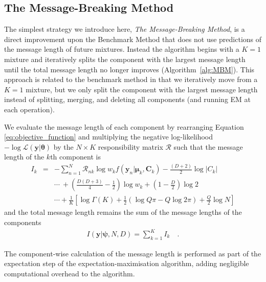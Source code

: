 \documentclass{elsarticle}
\newcommand{\vect}[1]{\boldsymbol{\mathbf{#1}}}
\renewcommand{\vec}[1]{\vect{#1}}
\def\cov{C}
\def\veccov{\vect{\cov}}
\def\vecmean{\vect{\mu}}
\def\vectheta{\vect{\theta}}
\def\weight{w}
\def\datum{y}
\def\data{\vect{\datum}}
\begin{document}
\subsection{The Message-Breaking Method} \label{sec:mbm}
The simplest strategy we introduce here, \emph{The Message-Breaking Method}, 
is a direct improvement upon the Benchmark Method that does not use predictions of the message length of future mixtures. Instead the algorithm begins with 
a $K=1$ mixture and iteratively splits the component with the largest message length until 
the total message length no longer improves (Algorithm~\ref{alg:MBM}). This approach is related to the benchmark method in that we iteratively move from a $K=1$ mixture, but we only split the component with the largest message length instead of splitting, merging, and deleting all components (and running EM at each operation).


We evaluate the message length of each component by rearranging Equation \ref{eq:objective_function} and multiplying the negative log-likelihood
$-\log{\mathcal{L}}(\vec\data|\vectheta)$ by the $N \times K$ responsibility matrix $\mathcal{R}$ 
such that the message length of the $k$th component is
\begin{eqnarray}
	I_k &=& -\sum_{n=1}^{N}\mathcal{R}_{nk}\log{\weight_{k}f(\data_{n}|\vecmean_k,\veccov_k)} -\frac{(D + 2)}{2}\log{|\cov_k|} \nonumber \\
		&& \cdots\ + \left(\frac{D(D+3)}{4}-\frac{1}{2}\right)\log{\weight_k} + \left(1 - \frac{D}{2}\right)\log{2} \nonumber \\
		&& \cdots + \frac{1}{K}\left[\log\Gamma(K) + \frac{1}{2}\left(\log{Q\pi} - Q\log{2\pi}\right) + \frac{Q}{2}\log{N}\right] \label{eq:component-message-length}
\end{eqnarray}
\noindent{}and the total message length remains the sum of the message lengths of the components
\begin{eqnarray}
	I(\vec\data|\vec\psi, N, D) = \sum_{k=1}^{K}I_{k} \quad .
\end{eqnarray}

The component-wise calculation of the message length is performed as part of the 
expectation step of the expectation-maximisation algorithm, adding negligible computational overhead to the algorithm.
\end{document}
